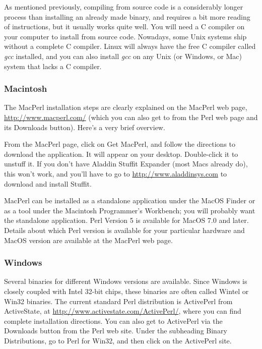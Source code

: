 As mentioned previously, compiling from source code is a considerably longer process than installing an already made binary, and requires a bit more reading of instructions, but it usually works quite well. You will need a C compiler on your computer to install from source code.  Nowadays, some Unix systems ship without a complete C compiler. Linux will always have the free C compiler called \textit{gcc} installed, and you can also install \textit{gcc} on any Unix (or Windows, or Mac) system that lacks a C compiler.

\subsubsection{Macintosh}
The MacPerl installation steps are clearly explained on the MacPerl web page, \href{http://www.macperl.com/}{http://www.macperl.com/} (which you can also get to from the Perl web page and its Downloads button). Here's a very brief overview.

From the MacPerl page, click on Get MacPerl, and follow the directions to download the application. It will appear on your desktop.  Double-click it to unstuff it. If you don't have Aladdin Stuffit Expander (most Macs already do), this won't work, and you'll have to go to \href{http://www.aladdinsys.com}{http://www.aladdinsys.com} to download and install Stuffit.

MacPerl can be installed as a standalone application under the MacOS Finder or as a tool under the Macintosh Programmer's Workbench; you will probably want the standalone application. Perl Version 5 is available for MacOS 7.0 and later. Details about which Perl version is available for your particular hardware and MacOS version are available at the MacPerl web page.

\subsubsection{Windows}
Several binaries for different Windows versions are available. Since Windows is closely coupled with Intel 32-bit chips, these binaries are often called Wintel or Win32 binaries. The current standard Perl distribution is ActivePerl from ActiveState, at \href{http://www.activestate.com/ActivePerl/}{http://www.activestate.com/ActivePerl/}, where you can find complete installation directions. You can also get to ActivePerl via the Downloads button from the Perl web site. Under the subheading Binary Distributions, go to Perl for Win32, and then click on the ActivePerl site.  

